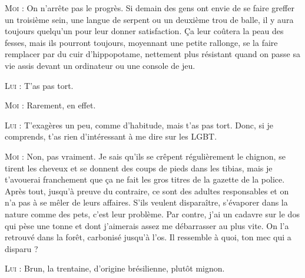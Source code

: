 \begin{dialogue}

\textsc{Moi} : On n’arrête pas le progrès. Si demain des gens ont envie de se faire greffer un troisième sein, une langue de serpent ou un deuxième trou de balle, il y aura toujours quelqu’un pour leur donner satisfaction. Ça leur coûtera la peau des fesses, mais ils pourront toujours, moyennant une petite rallonge, se la faire remplacer par du cuir d’hippopotame, nettement plus résistant quand on passe sa vie assis devant un ordinateur ou une console de jeu.


\textsc{Lui} : T’as pas tort.

\textsc{Moi} : Rarement, en effet.

\textsc{Lui} : T’exagères un peu, comme d’habitude, mais t’as pas tort. Donc, si je comprends, t’as rien d’intéressant à me dire sur les LGBT.

%
%
%
\textsc{Moi} : Non, pas vraiment. Je sais qu’ils se crêpent régulièrement le chignon, se tirent les cheveux et se donnent des coups de pieds dans les tibias, mais je t’avouerai franchement que ça ne fait les gros titres de la gazette de la police. Après tout, jusqu’à preuve du contraire, ce sont des adultes responsables et on n’a pas à se mêler de leurs affaires. S’ils veulent disparaître, s’évaporer dans la nature comme des pets, c’est leur problème. Par contre, j’ai un cadavre sur le dos qui pèse une tonne et dont j’aimerais assez me débarrasser au plus vite. On l’a retrouvé dans la forêt, carbonisé jusqu’à l’os. Il ressemble à quoi, ton mec qui a disparu ?

\textsc{Lui} : Brun, la trentaine, d’origine brésilienne, plutôt mignon.

\end{dialogue}

